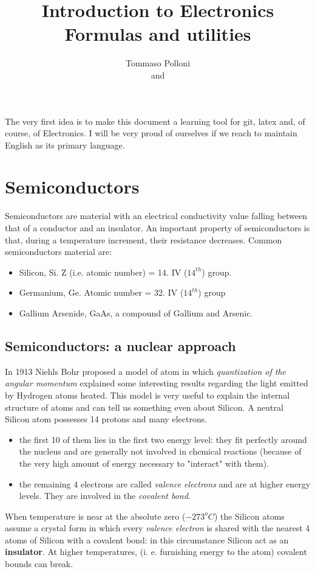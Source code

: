 \documentclass[12pt]{article}
\newcommand{\I}{\textit}
\begin{document}
 
 
 
\title{Introduction to Electronics\\
Formulas and utilities}
\author{Tommaso Polloni\\
and }
 
 The very first idea is to make this document a learning tool for git, latex and, of course, of Electronics. I will be very proud of ourselves if we reach to maintain English as its primary language.
\maketitle
\tableofcontents

\section{Semiconductors} 
Semiconductors are material with an electrical conductivity value falling between that of a conductor and an insulator.
An important property of semiconductors is that, during a temperature increment, their resistance decreases.
Common semiconductors material are:
\begin{itemize}
	\item {}Silicon, Si. Z (i.e. atomic number) = 14. IV ($14^{th}$) group.
	\item Germanium, Ge. Atomic number = 32. IV ($14^{th}$) group
	\item Gallium Arsenide, GaAs, a compound of Gallium and Arsenic.
\end{itemize}

\subsection{Semiconductors: a nuclear approach}
In 1913 Niehls Bohr  proposed a model of atom in which \I{quantization of the angular momentum}  explained some interesting results regarding the light emitted by Hydrogen atoms heated. This model is very useful to explain the internal structure of atoms and can tell us something even about Silicon. A neutral Silicon atom possesses 14 protons and many electrons.
\begin{itemize}
	\item the first 10 of them lies in the first two energy level: they fit perfectly around the nucleus and  are generally not involved in chemical reactions (because of the very high amount of energy necessary to "interact" with them).
	\item the remaining 4 electrons are called \textit{valence electrons} and are at higher energy levels. They are involved in the \textit{covalent bond}.
\end{itemize}
When temperature is near at the absolute zero ($-273^o C$) the Silicon atoms assume a crystal form in which every \textit{valence electron} is shared with the nearest 4 atoms of Silicon with a covalent bond: in this circumstance Silicon act as an \textbf{insulator}.
At higher temperatures, (i. e. furnishing energy to the atom) covalent bounds can break. 
\end{document}
